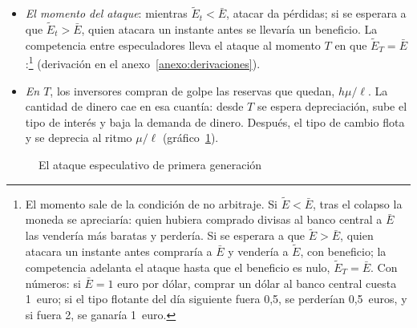\documentclass[11pt]{article}
\begin{document}
\begin{itemize}
\item \emph{El momento del ataque}: mientras $\tilde E_t<\bar E$, atacar da pérdidas; si se esperara a que $\tilde E_t>\bar E$, quien atacara un instante antes se llevaría un beneficio. La competencia entre especuladores lleva el ataque al momento $T$ en que $\tilde E_T=\bar E$:\footnote{El momento sale de la condición de no arbitraje. Si $\tilde E<\bar E$, tras el colapso la moneda se apreciaría: quien hubiera comprado divisas al banco central a $\bar E$ las vendería más baratas y perdería. Si se esperara a que $\tilde E>\bar E$, quien atacara un instante antes compraría a $\bar E$ y vendería a $\tilde E$, con beneficio; la competencia adelanta el ataque hasta que el beneficio es nulo, $\tilde E_T=\bar E$. Con números: si $\bar E=1$ euro por dólar, comprar un dólar al banco central cuesta 1~euro; si el tipo flotante del día siguiente fuera 0,5, se perderían 0,5~euros, y si fuera 2, se ganaría 1~euro.}
  (derivación en el anexo~\ref{anexo:derivaciones}).
\item \emph{En $T$}, los inversores compran de golpe las reservas que quedan, $h\mu/\ell$. La cantidad de dinero cae en esa cuantía: desde $T$ se espera depreciación, sube el tipo de interés y baja la demanda de dinero. Después, el tipo de cambio flota y se deprecia al ritmo $\mu/\ell$ (gráfico~\ref{fig:primera-generacion}).
\end{itemize}

\begin{figure}[H]
\centering
\caption{El ataque especulativo de primera generación}\label{fig:primera-generacion}
\end{figure}
\end{document}
